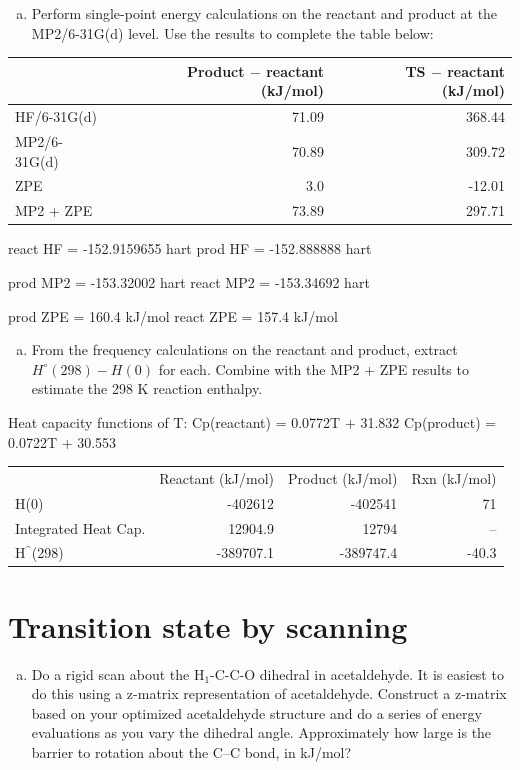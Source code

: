 \documentclass[11pt]{article}
\begin{document}
\begin{enumerate}[(d)]
\item Perform single-point energy calculations on the reactant and product at the MP2/6-31G(d) level.  Use the results to complete the table below:
\end{enumerate}

\begin{center}
\begin{tabular}{lrr}
\hline
 & Product \(-\) reactant  (kJ/mol) & TS \(-\) reactant (kJ/mol)\\
\hline
HF/6-31G(d) & 71.09 & 368.44\\
MP2/6-31G(d) & 70.89 & 309.72\\
ZPE & 3.0 & -12.01\\
MP2 + ZPE & 73.89 & 297.71\\
\hline
\end{tabular}
\end{center}
react HF = -152.9159655 hart
prod HF = -152.888888 hart 

prod MP2 = -153.32002 hart 
react MP2 = -153.34692 hart

prod ZPE = 160.4 kJ/mol
react ZPE = 157.4 kJ/mol

\begin{enumerate}[(e)]
\item From the frequency calculations on the reactant and product, extract \(H^{\circ}(298)-H(0)\) for each.  Combine with the MP2 + ZPE results to estimate the 298 K reaction enthalpy.
\end{enumerate}

Heat capacity functions of T:
Cp(reactant) = 0.0772T + 31.832 
Cp(product) = 0.0722T + 30.553


\begin{center}
\begin{tabular}{lrrr}
 & Reactant (kJ/mol) & Product (kJ/mol) & Rxn  (kJ/mol)\\
H(0) & -402612 & -402541 & 71\\
Integrated Heat Cap. & 12904.9 & 12794 & --\\
H\(^{\^{}}\)(298) & -389707.1 & -389747.4 & -40.3\\
\end{tabular}
\end{center}


\section{Transition state by scanning}
\label{sec:orga59738f}
\begin{enumerate}[(a)]
\item Do a rigid scan about the H\(_{\text{1}}\)-C-C-O dihedral in acetaldehyde. It is easiest to do this using a z-matrix representation of acetaldehyde. Construct a z-matrix based on your optimized acetaldehyde structure and do a series of energy evaluations as you vary the dihedral angle. Approximately how large is the barrier to rotation about the C–C bond, in kJ/mol?
\end{enumerate}
\end{document}
